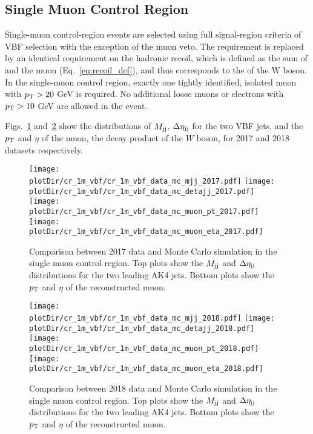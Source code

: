 \clearpage

\subsection{Single Muon Control Region}
\label{sec:selection_cr_1m}

Single-muon control-region events are selected using full signal-region criteria of VBF selection with the exception of the muon veto. 
The \ptmiss requirement is replaced by an identical requirement on the hadronic recoil, which is defined as the sum of \ptvecmiss and the muon \vpt (Eq.~\ref{eq:recoil_def}), 
and thus corresponds to the \pt of the W boson.
In the single-muon control region, exactly one tightly identified, isolated muon with $p_{\textrm{T}} > 20$ GeV is required. 
No additional loose muons or electrons with $p_{\textrm{T}} > 10$ GeV are allowed in the event.

Figs.~\ref{fig:cr_1m_vbf_2017_mtr} and~\ref{fig:cr_1m_vbf_2018_mtr} show the distributions of $M_{\textrm{jj}}$, $\Delta \eta_{\textrm{jj}}$ for the two VBF jets,
and the $p_{\textrm{T}}$ and $\eta$ of the muon, the decay product of the $W$ boson, for 2017 and 2018 datasets respectively.

\begin{figure}[htbp]
    \begin{center}
        \texttt{[image: \\plotDir/cr\_1m\_vbf/cr\_1m\_vbf\_data\_mc\_mjj\_2017.pdf]}
        \texttt{[image: \\plotDir/cr\_1m\_vbf/cr\_1m\_vbf\_data\_mc\_detajj\_2017.pdf]} \\
        \texttt{[image: \\plotDir/cr\_1m\_vbf/cr\_1m\_vbf\_data\_mc\_muon\_pt\_2017.pdf]}
        \texttt{[image: \\plotDir/cr\_1m\_vbf/cr\_1m\_vbf\_data\_mc\_muon\_eta\_2017.pdf]}
    \end{center}
    \caption{Comparison between 2017 data and Monte Carlo simulation in the single muon control region. Top plots
        show the $M_{\textrm{jj}}$ and $\Delta \eta_{\textrm{jj}}$ distributions for the two leading AK4 jets. Bottom plots show the $p_{\textrm{T}}$ and $\eta$
        of the reconstructed muon.}
    \label{fig:cr_1m_vbf_2017_mtr}
\end{figure}

\begin{figure}[htbp]
    \begin{center}
        \texttt{[image: \\plotDir/cr\_1m\_vbf/cr\_1m\_vbf\_data\_mc\_mjj\_2018.pdf]}
        \texttt{[image: \\plotDir/cr\_1m\_vbf/cr\_1m\_vbf\_data\_mc\_detajj\_2018.pdf]} \\
        \texttt{[image: \\plotDir/cr\_1m\_vbf/cr\_1m\_vbf\_data\_mc\_muon\_pt\_2018.pdf]}
        \texttt{[image: \\plotDir/cr\_1m\_vbf/cr\_1m\_vbf\_data\_mc\_muon\_eta\_2018.pdf]}
    \end{center}
    \caption{Comparison between 2018 data and Monte Carlo simulation in the single muon control region. Top plots
    show the $M_{\textrm{jj}}$ and $\Delta \eta_{\textrm{jj}}$ distributions for the two leading AK4 jets. Bottom plots show the $p_{\textrm{T}}$ and $\eta$
    of the reconstructed muon.}
    \label{fig:cr_1m_vbf_2018_mtr}
\end{figure}

